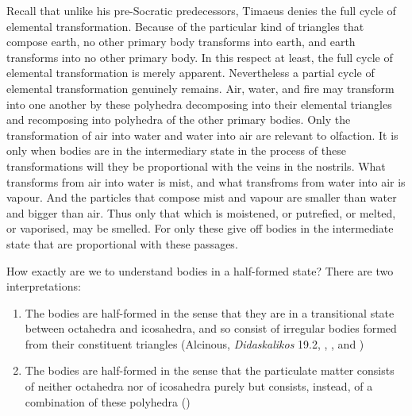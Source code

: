 Recall that unlike his pre-Socratic predecessors, Timaeus denies the full cycle of elemental transformation. Because of the particular kind of triangles that compose earth, no other primary body transforms into earth, and earth transforms into no other primary body. In this respect at least, the full cycle of elemental transformation is merely apparent. Nevertheless a partial cycle of elemental transformation genuinely remains. Air, water, and fire may transform into one another by these polyhedra decomposing into their elemental triangles and recomposing into polyhedra of the other primary bodies. Only the transformation of air into water and water into air are relevant to olfaction. It is only when bodies are in the intermediary state in the process of these transformations will they be proportional with the veins in the nostrils. What transforms from air into water is mist, and what transfroms from water into air is vapour. And the particles that compose mist and vapour are smaller than water and bigger than air. Thus only that which is moistened, or putrefied, or melted, or vaporised, may be smelled. For only these give off bodies in the intermediate state that are proportional with these passages.

How exactly are we to understand bodies in a half-formed state? There are two interpretations:
\begin{enumerate}[(1)]
	\item The bodies are half-formed in the sense that they are in a transitional state between octahedra and icosahedra, and so consist of irregular bodies formed from their constituent triangles (Alcinous, \emph{Didaskalikos} 19.2, \citealt[275 n8]{Archer-Hind:1888qd}, \citealt[471]{Taylor:1928qb}, and \citealt[274]{Cornford:1935fk})
	\item The bodies are half-formed in the sense that the particulate matter consists of neither octahedra nor of icosahedra purely but consists, instead, of a combination of these polyhedra (\citealt{Vlastos:1967jw})
\end{enumerate}

